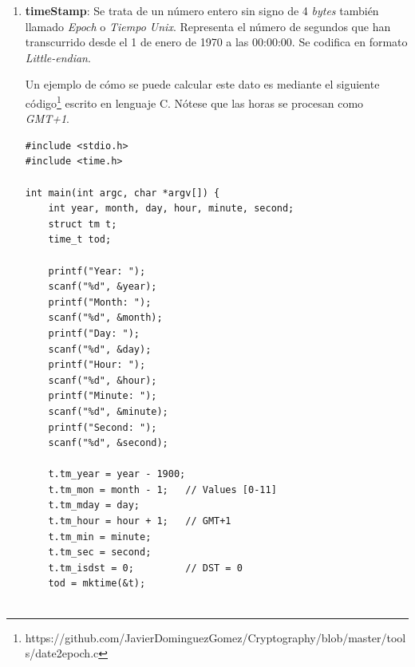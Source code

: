\documentclass{article}
\begin{document}
\begin{enumerate}
\begin{verbatim}
    for (string node; buf >> node;)
        leafNodesV.push_back(sha256(node));
        
    printVector(leafNodesV);
    cout << "Root: " << merkleTree(leafNodesV) << endl;
    
    return 0;
}

string merkleTree(vector<string> v) {
    if (v.size() > 1) {
        vector<string> aux;
        int i;
        
        for (i = 0; i < v.size(); i += 2) {
            if (i == v.size() - 1) {
                aux.push_back(v[i]);
            } else if (i < v.size()) {
                aux.push_back(sha256(v[i] + v[i + 1]));
            }
        }
        merkleTree(aux);
    } else if(v.size() == 1){
        merkleTreeRoot = v[0];
    }
    
    return merkleTreeRoot;
}

void printVector(vector<string> v) {
    cout << "v.size() = " << v.size() << endl;
    int i = 0;
    while (i < v.size()) {
        cout << "v[" << i << "]: " << v[i] << endl;
        i++;
    }
}
        \end{verbatim}
        
        \item \textbf{timeStamp}: Se trata de un número entero sin signo de 4 \textit{bytes} también llamado \textit{Epoch} o \textit{Tiempo Unix}. Representa el número de segundos que han transcurrido desde el 1 de enero de 1970 a las 00:00:00. Se codifica en formato \textit{Little-endian}.
        
        Un ejemplo de cómo se puede calcular este dato es mediante el siguiente código\footnote{https://github.com/JavierDominguezGomez/Cryptography/blob/master/tools/date2epoch.c} escrito en lenguaje C. Nótese que las horas se procesan como \textit{GMT+1}.
        
        \begin{verbatim}
#include <stdio.h>
#include <time.h>

int main(int argc, char *argv[]) {
    int year, month, day, hour, minute, second;
    struct tm t;
    time_t tod;
    
    printf("Year: ");
    scanf("%d", &year);
    printf("Month: ");
    scanf("%d", &month);
    printf("Day: ");
    scanf("%d", &day);
    printf("Hour: ");
    scanf("%d", &hour);
    printf("Minute: ");
    scanf("%d", &minute);
    printf("Second: ");
    scanf("%d", &second);
    
    t.tm_year = year - 1900;
    t.tm_mon = month - 1;   // Values [0-11]
    t.tm_mday = day;
    t.tm_hour = hour + 1;   // GMT+1
    t.tm_min = minute;
    t.tm_sec = second;
    t.tm_isdst = 0;         // DST = 0
    tod = mktime(&t);
    

\end{verbatim}
\end{enumerate}
\end{document}
